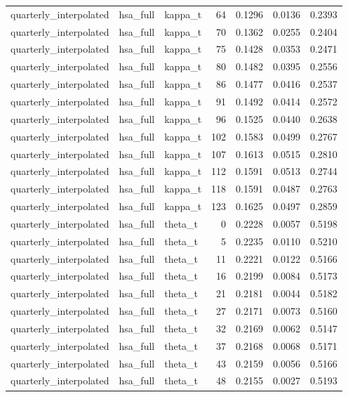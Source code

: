 \begin{tabular}{lllrrrr}
quarterly\_interpolated & hsa\_full & kappa\_t & 64 & 0.1296 & 0.0136 & 0.2393 \\
quarterly\_interpolated & hsa\_full & kappa\_t & 70 & 0.1362 & 0.0255 & 0.2404 \\
quarterly\_interpolated & hsa\_full & kappa\_t & 75 & 0.1428 & 0.0353 & 0.2471 \\
quarterly\_interpolated & hsa\_full & kappa\_t & 80 & 0.1482 & 0.0395 & 0.2556 \\
quarterly\_interpolated & hsa\_full & kappa\_t & 86 & 0.1477 & 0.0416 & 0.2537 \\
quarterly\_interpolated & hsa\_full & kappa\_t & 91 & 0.1492 & 0.0414 & 0.2572 \\
quarterly\_interpolated & hsa\_full & kappa\_t & 96 & 0.1525 & 0.0440 & 0.2638 \\
quarterly\_interpolated & hsa\_full & kappa\_t & 102 & 0.1583 & 0.0499 & 0.2767 \\
quarterly\_interpolated & hsa\_full & kappa\_t & 107 & 0.1613 & 0.0515 & 0.2810 \\
quarterly\_interpolated & hsa\_full & kappa\_t & 112 & 0.1591 & 0.0513 & 0.2744 \\
quarterly\_interpolated & hsa\_full & kappa\_t & 118 & 0.1591 & 0.0487 & 0.2763 \\
quarterly\_interpolated & hsa\_full & kappa\_t & 123 & 0.1625 & 0.0497 & 0.2859 \\
quarterly\_interpolated & hsa\_full & theta\_t & 0 & 0.2228 & 0.0057 & 0.5198 \\
quarterly\_interpolated & hsa\_full & theta\_t & 5 & 0.2235 & 0.0110 & 0.5210 \\
quarterly\_interpolated & hsa\_full & theta\_t & 11 & 0.2221 & 0.0122 & 0.5166 \\
quarterly\_interpolated & hsa\_full & theta\_t & 16 & 0.2199 & 0.0084 & 0.5173 \\
quarterly\_interpolated & hsa\_full & theta\_t & 21 & 0.2181 & 0.0044 & 0.5182 \\
quarterly\_interpolated & hsa\_full & theta\_t & 27 & 0.2171 & 0.0073 & 0.5160 \\
quarterly\_interpolated & hsa\_full & theta\_t & 32 & 0.2169 & 0.0062 & 0.5147 \\
quarterly\_interpolated & hsa\_full & theta\_t & 37 & 0.2168 & 0.0068 & 0.5171 \\
quarterly\_interpolated & hsa\_full & theta\_t & 43 & 0.2159 & 0.0056 & 0.5166 \\
quarterly\_interpolated & hsa\_full & theta\_t & 48 & 0.2155 & 0.0027 & 0.5193 \\

\end{tabular}
